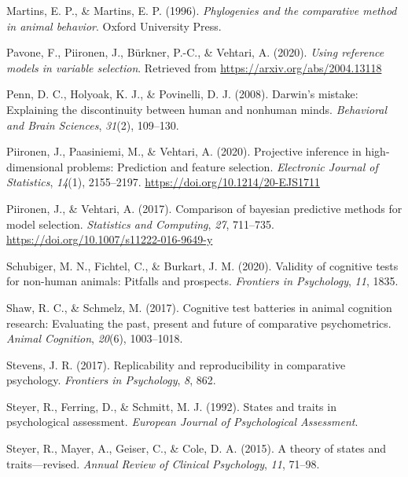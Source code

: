 \documentclass[
  man,floatsintext]{apa6}
\newlength{\cslhangindent}
\newlength{\cslentryspacingunit} %
\newenvironment{CSLReferences}[2] %
 {%
  \setlength{\parindent}{0pt}
  \ifodd #1
  \let\oldpar\par
  \def\par{\hangindent=\cslhangindent\oldpar}
  \fi
  \setlength{\parskip}{#2\cslentryspacingunit}
 }%
 {}
\begin{document}
\begin{CSLReferences}{1}{0}
\leavevmode{}%
Martins, E. P., \& Martins, E. P. (1996). \emph{Phylogenies and the comparative method in animal behavior}. Oxford University Press.

\leavevmode{}%
Pavone, F., Piironen, J., Bürkner, P.-C., \& Vehtari, A. (2020). \emph{Using reference models in variable selection}. Retrieved from \url{https://arxiv.org/abs/2004.13118}

\leavevmode{}%
Penn, D. C., Holyoak, K. J., \& Povinelli, D. J. (2008). Darwin's mistake: Explaining the discontinuity between human and nonhuman minds. \emph{Behavioral and Brain Sciences}, \emph{31}(2), 109--130.

\leavevmode{}%
Piironen, J., Paasiniemi, M., \& Vehtari, A. (2020). {Projective inference in high-dimensional problems: Prediction and feature selection}. \emph{Electronic Journal of Statistics}, \emph{14}(1), 2155--2197. \url{https://doi.org/10.1214/20-EJS1711}

\leavevmode{}%
Piironen, J., \& Vehtari, A. (2017). Comparison of bayesian predictive methods for model selection. \emph{Statistics and Computing}, \emph{27}, 711--735. \url{https://doi.org/10.1007/s11222-016-9649-y}

\leavevmode{}%
Schubiger, M. N., Fichtel, C., \& Burkart, J. M. (2020). Validity of cognitive tests for non-human animals: Pitfalls and prospects. \emph{Frontiers in Psychology}, \emph{11}, 1835.

\leavevmode{}%
Shaw, R. C., \& Schmelz, M. (2017). Cognitive test batteries in animal cognition research: Evaluating the past, present and future of comparative psychometrics. \emph{Animal Cognition}, \emph{20}(6), 1003--1018.

\leavevmode{}%
Stevens, J. R. (2017). Replicability and reproducibility in comparative psychology. \emph{Frontiers in Psychology}, \emph{8}, 862.

\leavevmode{}%
Steyer, R., Ferring, D., \& Schmitt, M. J. (1992). States and traits in psychological assessment. \emph{European Journal of Psychological Assessment}.

\leavevmode{}%
Steyer, R., Mayer, A., Geiser, C., \& Cole, D. A. (2015). A theory of states and traits---revised. \emph{Annual Review of Clinical Psychology}, \emph{11}, 71--98.


\end{CSLReferences}
\end{document}

